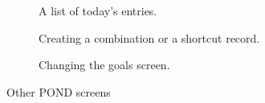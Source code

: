 \begin{figure}	
\centering
\begin{subfigure}[t]{1.25in}
		\centering
		\setlength\fboxsep{0pt}
\setlength\fboxrule{0.5pt}
		\caption{A list of today's entries. }\label{fig:pond_details_c}
	\end{subfigure}
\quad
	\begin{subfigure}[t]{1.25in}
		\centering
		\setlength\fboxsep{0pt}
\setlength\fboxrule{0.5pt}
		\caption{Creating a combination or a shortcut record.}\label{fig:pond_combo}
	\end{subfigure}
\quad
\begin{subfigure}[t]{1.25in}
		\centering
		\setlength\fboxsep{0pt}
\setlength\fboxrule{0.5pt}
		\caption{Changing the goals screen.  }\label{fig:pond_goals}
	\end{subfigure}

	\caption{Other POND screens}\label{fig:pond_details}
\end{figure}

